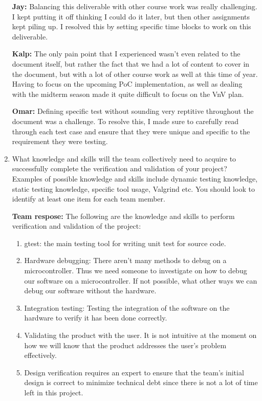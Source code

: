 \documentclass[12pt, titlepage]{article}
\begin{document}
\begin{enumerate}
  \textbf{Jay:} Balancing this deliverable with other course work was really challenging. 
  I kept putting it off thinking I could do it later, but then other assignments kept piling up. 
  I resolved this by setting specific time blocks to work on this deliverable.

  \textbf{Kalp:} The only pain point that I experienced wasn't even related to
  the document itself, but rather the fact that we had a lot of content to cover
  in the document, but with a lot of other course work as well at this time of
  year. Having to focus on the upcoming PoC implementation, as well as dealing 
  with the midterm season made it quite difficult to focus on the VnV plan.

  \textbf{Omar:} Defining specific test without sounding very reptitive 
  throughout the document was a challenge. To resolve this, I made sure to
  carefully read through each test case and ensure that they were unique and
  specific to the requirement they were testing.

  \item What knowledge and skills will the team collectively need to acquire to
  successfully complete the verification and validation of your project?
  Examples of possible knowledge and skills include dynamic testing knowledge,
  static testing knowledge, specific tool usage, Valgrind etc.  You should look
  to identify at least one item for each team member.
  
  \textbf{Team respose:} The following are the knowledge and skills to perform
  verification and validation of the project:

  \begin{enumerate}
    \item gtest: the main testing tool for writing unit test for source code.
    \item Hardware debugging: There aren't many methods to debug on a
    microcontroller. Thus we need someone to investigate on how to debug our
    software on a microcontroller. If not possible, what other ways we can debug
    our software without the hardware.
    \item Integration testing: Testing the integration of the software on the
    hardware to verify it has been done correctly.
    \item Validating the product with the user. It is not intuitive at the
    moment on how we will know that the product addresses the user's problem
    effectively.
    \item Design verification requires an expert to ensure that the team's
    initial design is correct to minimize technical debt since there is not
    a lot of time left in this project.
  \end{enumerate}


\end{enumerate}
\end{document}
